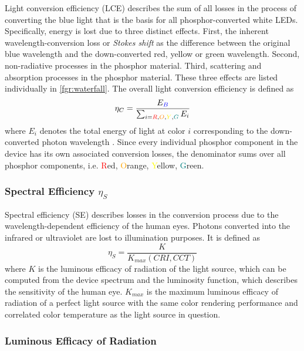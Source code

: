 \documentclass[parskip=full]{article}
\begin{document}
Light conversion efficiency (LCE) describes the sum of all losses in the process of converting the blue light that is the basis for all phosphor-converted white LEDs. Specifically, energy is lost due to three distinct effects. First, the inherent wavelength-conversion loss or \textit{Stokes shift} as the difference between the original blue wavelength and the down-converted red, yellow or green wavelength. Second, non-radiative processes in the phosphor material. Third, scattering and absorption processes in the phosphor material. These three effects are listed individually in \cref{fgr:waterfall}. The overall light conversion efficiency is defined as
%
\begin{equation}
    \eta_{C} = \frac{E_{\textcolor{blue}{B}}}{\sum_{i=\textcolor{red}{R},\textcolor{orange}{O},\textcolor{yellow}{Y},\textcolor{teal}{G}} E_i}
\end{equation}
%
where $E_i$ denotes the total energy of light at color $i$ corresponding to the down-converted photon wavelength \cite{schubert2018light}\cite{tsao2010solid}. Since every individual phosphor component in the device has its own associated conversion losses, the denominator sums over all phosphor components, i.e. \textcolor{red}{R}ed, \textcolor{orange}{O}range, \textcolor{yellow}{Y}ellow, \textcolor{teal}{G}reen.

\subsubsection{Spectral Efficiency $\eta_{S}$}

Spectral efficiency (SE) describes losses in the conversion process due to the wavelength-dependent efficiency of the human eyes. Photons converted into the infrared or ultraviolet are lost to illumination purposes. It is defined as
%
\begin{equation}
    \eta_{S} = \frac{K}{K_{max}(CRI,CCT)}
\end{equation}
%
where $K$ is the luminous efficacy of radiation of the light source, which can be computed from the device spectrum and the luminosity function, which describes the sensitivity of the human eye. $K_{max}$ is the maximum luminous efficacy of radiation of a perfect light source with the same color rendering performance and correlated color temperature as the light source in question\cite{schubert2018light}\cite{tsao2010solid}.

\subsubsection{Luminous Efficacy of Radiation}
\label{subsec:ler}
\end{document}
